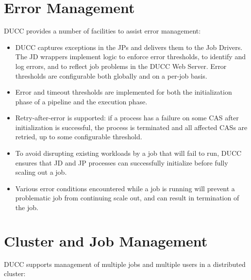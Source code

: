   
    \section{Error Management }
    DUCC provides a number of facilities to assist error management:
    
    \begin{itemize}
      \item DUCC captures exceptions in the JPs and delivers them
        to the Job Drivers. The JD wrappers implement logic to enforce error thresholds, to identify
        and log errors, and to reflect job problems in the DUCC Web Server.  Error thresholds are
        configurable both globally and on a per-job basis.

      \item Error and timeout thresholds are implemented for both the initialization phase of a pipeline
        and the execution phase.
    
      \item Retry-after-error is supported: if a process has a failure on some CAS after
        initialization is successful, the process is terminated and all affected CASs are retried, up to some
        configurable threshold.

      \item To avoid disrupting existing workloads by a job that will fail to run,
        DUCC ensures that JD and JP processes can successfully initialize before fully scaling out a job.

      \item Various error conditions encountered  while a job is running will prevent a problematic job
        from continuing scale out, and can result in termination of the job.
      \end{itemize}
      
    \section{Cluster and Job Management}
    DUCC supports  management of multiple jobs and multiple users in a distributed cluster:

